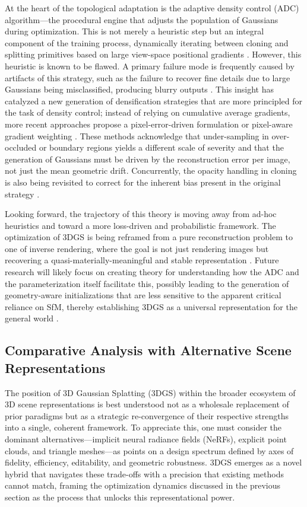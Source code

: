 \documentclass[11pt,a4paper]{article}
\begin{document}
At the heart of the topological adaptation is the adaptive density control (ADC) algorithm---the procedural engine that adjusts the population of Gaussians during optimization. This is not merely a heuristic step but an integral component of the training process, dynamically iterating between cloning and splitting primitives based on large view-space positional gradients \cite{arxiv:2308.04079v1}. However, this heuristic is known to be flawed. A primary failure mode is frequently caused by artifacts of this strategy, such as the failure to recover fine details due to large Gaussians being misclassified, producing blurry outputs \cite{arxiv:2404.10484v1}. This insight has catalyzed a new generation of densification strategies that are more principled for the task of density control; instead of relying on cumulative average gradients, more recent approaches propose a pixel-error-driven formulation \cite{arxiv:2406.12080v1} or pixel-aware gradient weighting \cite{arxiv:2403.15530v1}. These methods acknowledge that under-sampling in over-occluded or boundary regions yields a different scale of severity and that the generation of Gaussians must be driven by the reconstruction error per image, not just the mean geometric drift. Concurrently, the opacity handling in cloning is also being revisited to correct for the inherent bias present in the original strategy \cite{arxiv:2404.06109v1}.

Looking forward, the trajectory of this theory is moving away from ad-hoc heuristics and toward a more loss-driven and probabilistic framework. The optimization of 3DGS is being reframed from a pure reconstruction problem to one of inverse rendering, where the goal is not just rendering images but recovering a quasi-materially-meaningful and stable representation \cite{arxiv:2406.06521v1,arxiv:2403.17888v1}. Future research will likely focus on creating theory for understanding how the ADC and the parameterization itself facilitate this, possibly leading to the generation of geometry-aware initializations that are less sensitive to the apparent critical reliance on SfM, thereby establishing 3DGS as a universal representation for the general world \cite{arxiv:2206.14735v2,arxiv:2404.00409v1}.


\subsection{Comparative Analysis with Alternative Scene Representations}


The position of 3D Gaussian Splatting (3DGS) within the broader ecosystem of 3D scene representations is best understood not as a wholesale replacement of prior paradigms but as a strategic re-convergence of their respective strengths into a single, coherent framework. To appreciate this, one must consider the dominant alternatives---implicit neural radiance fields (NeRFs), explicit point clouds, and triangle meshes---as points on a design spectrum defined by axes of fidelity, efficiency, editability, and geometric robustness. 3DGS emerges as a novel hybrid that navigates these trade-offs with a precision that existing methods cannot match, framing the optimization dynamics discussed in the previous section as the process that unlocks this representational power.
\end{document}
